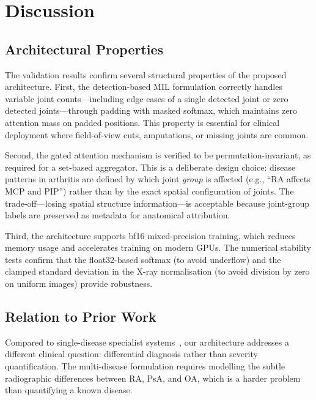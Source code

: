 \documentclass{article}
\begin{document}
\section{Discussion}
\label{sec:discussion}

\subsection{Architectural Properties}

The validation results confirm several structural properties of the proposed architecture. First, the detection-based MIL formulation correctly handles variable joint counts---including edge cases of a single detected joint or zero detected joints---through padding with masked softmax, which maintains zero attention mass on padded positions. This property is essential for clinical deployment where field-of-view cuts, amputations, or missing joints are common.

Second, the gated attention mechanism is verified to be permutation-invariant, as required for a set-based aggregator. This is a deliberate design choice: disease patterns in arthritis are defined by which joint \emph{group} is affected (e.g., ``RA affects MCP and PIP'') rather than by the exact spatial configuration of joints. The trade-off---losing spatial structure information---is acceptable because joint-group labels are preserved as metadata for anatomical attribution.

Third, the architecture supports bf16 mixed-precision training, which reduces memory usage and accelerates training on modern GPUs. The numerical stability tests confirm that the float32-based softmax (to avoid underflow) and the clamped standard deviation in the X-ray normalisation (to avoid division by zero on uniform images) provide robustness.

\subsection{Relation to Prior Work}

Compared to single-disease specialist systems~\cite{autoscora2026,scirep2025,psavit2024}, our architecture addresses a different clinical question: differential diagnosis rather than severity quantification. The multi-disease formulation requires modelling the subtle radiographic differences between RA, PsA, and OA, which is a harder problem than quantifying a known disease.
\end{document}
